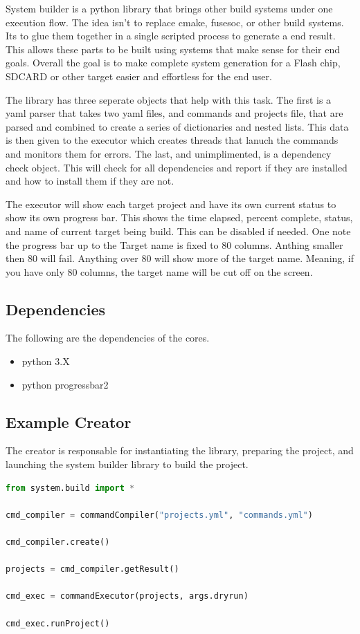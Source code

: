 \par
System builder is a python library that brings other build systems under one execution flow. The idea isn't to replace cmake, fusesoc, or other build systems. Its to glue
them together in a single scripted process to generate a end result. This allows these parts to be built using systems that make sense for their end goals. Overall the goal
is to make complete system generation for a Flash chip, SDCARD or other target easier and effortless for the end user.
\par
The library has three seperate objects that help with this task. The first is a yaml parser
that takes two yaml files, and commands and projects file, that are parsed and combined to create a series of dictionaries and nested lists. This data is then given to the executor
which creates threads that lanuch the commands and monitors them for errors. The last, and unimplimented, is a dependency check object. This will check for all dependencies and
report if they are installed and how to install them if they are not.
\par
The executor will show each target project and have its own current status to show its own progress bar. This shows the time elapsed, percent complete, status, and name of current target being build. This can be
disabled if needed. One note the progress bar up to the Target name is fixed to 80 columns. Anthing smaller then 80 will fail. Anything over 80 will show more of the target name. Meaning,
if you have only 80 columns, the target name will be cut off on the screen.

\subsection{Dependencies}

\par
The following are the dependencies of the cores.

\begin{itemize}
  \item python 3.X
  \item python progressbar2
\end{itemize}

\subsection{Example Creator}
\par
The creator is responsable for instantiating the library, preparing the project, and launching the system builder library to build the project.
\begin{lstlisting}[language=Python]
from system.build import *

cmd_compiler = commandCompiler("projects.yml", "commands.yml")

cmd_compiler.create()

projects = cmd_compiler.getResult()

cmd_exec = commandExecutor(projects, args.dryrun)

cmd_exec.runProject()

\end{lstlisting}

